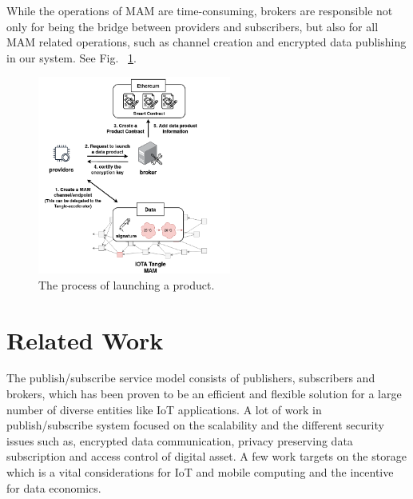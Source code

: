 \documentclass[conference]{IEEEtran}
\begin{document}
While the operations of MAM are time-consuming, brokers are responsible not only for being the bridge between providers and subscribers, but also for all MAM related operations, such as channel creation and encrypted data publishing in our system. See Fig.~ \ref{fig:launching_product}.

\begin{figure}[!t]
    \centering
    \includegraphics[width=2.5in]{launching_product}
    \caption{The process of launching a product.}
    \label{fig:launching_product}
\end{figure}

\section{Related Work}
The publish/subscribe service model consists of publishers, subscribers and brokers, which has been proven\cite{pubSubAnalysis, pubSubAnalysis2} to be an efficient and flexible solution for a large number of diverse entities like IoT applications. A lot of work in publish/subscribe system focused on the scalability and the different security issues such as, encrypted data communication, privacy preserving data subscription and access control of digital asset. A few work targets on the storage which is a vital considerations for IoT and mobile computing and the incentive for data economics.
\end{document}
